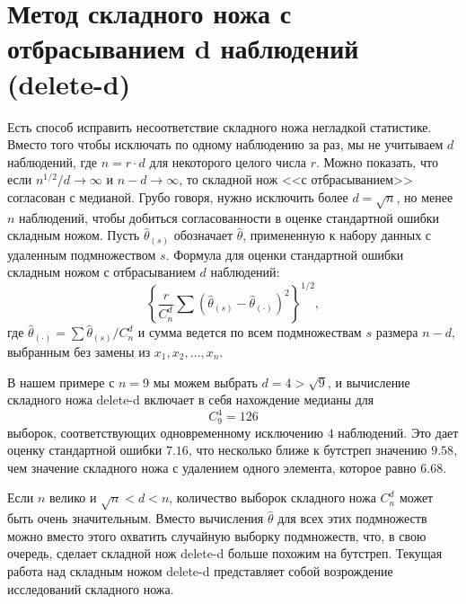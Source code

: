 \section{Метод складного ножа с отбрасыванием d наблюдений (delete-d)}
Есть способ исправить несоответствие складного ножа негладкой статистике. Вместо того чтобы исключать по одному наблюдению за раз, мы не учитываем $d$ наблюдений, где $n = r \cdot d$ для некоторого целого числа $r$. Можно показать, что если $n^{1/2}/d \rightarrow \infty$ и $n-d \rightarrow \infty$, то складной нож <<с отбрасыванием>> согласован с медианой. Грубо говоря, нужно исключить более $d = \sqrt{n}$, но менее $n$ наблюдений, чтобы добиться согласованности в оценке стандартной ошибки складным ножом. Пусть $\hat{\theta}_{(s)}$ обозначает $\hat{\theta}$, примененную к набору данных с удаленным подмножеством $s$. Формула для оценки стандартной ошибки складным ножом с отбрасыванием $d$ наблюдений:
\begin{equation}\label{eq11.21}
    \left\{\frac{r}{C^{d}_{n}}\sum\left(\hat{\theta}_{(s)} - \hat{\theta}_{(\cdot)}\right)^2\right\}^{1/2},
\end{equation}
где $\hat{\theta}_{(\cdot)} = \sum\hat{\theta}_{(s)}/C^{d}_{n}$ и сумма ведется по всем подмножествам $s$ размера $n - d$, выбранным без замены из $x_1, x_2, \dots, x_n$.

В нашем примере с $n = 9$ мы можем выбрать $d = 4> \sqrt{9}$, и вычисление складного ножа delete-d включает в себя нахождение медианы для
\begin{equation}\label{eq11.22}
    C^{4}_{9} = 126
\end{equation}
выборок, соответствующих одновременному исключению $4$ наблюдений. Это дает оценку стандартной ошибки $7.16$, что несколько ближе к бутстреп значению $9.58$, чем значение складного ножа с удалением одного элемента, которое равно $6.68$.

Если $n$ велико и $\sqrt{n} < d < n$, количество выборок складного ножа $C^{d}_{n}$ может быть очень значительным. Вместо вычисления $\hat{\theta}$ для всех этих подмножеств можно вместо этого охватить случайную выборку подмножеств, что, в свою очередь, сделает складной нож delete-d больше похожим на бутстреп. Текущая работа над складным ножом delete-d представляет собой возрождение исследований складного ножа.